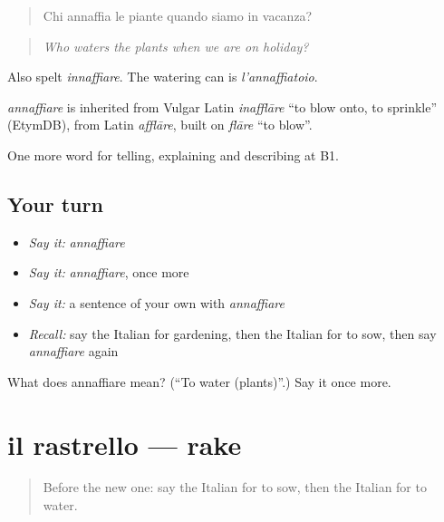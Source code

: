 \begin{quote}
Chi annaffia le piante quando siamo in vacanza?
\end{quote}

\begin{quote}
\emph{Who waters the plants when we are on holiday?}
\end{quote}

Also spelt \emph{innaffiare}. The watering can is \emph{l'annaffiatoio}.

\begin{cousinweb}
\emph{annaffiare} is inherited from Vulgar Latin \emph{inafflāre} \textquotedblleft{}to blow onto, to sprinkle\textquotedblright{} (EtymDB), from Latin \emph{afflāre}, built on \emph{flāre} \textquotedblleft{}to blow\textquotedblright{}.
\end{cousinweb}

\begin{grammarlens}[title={What you've built}]
One more word for telling, explaining and describing at B1.
\end{grammarlens}

\subsection*{Your turn}
\begin{itemize}
\raggedright
  \item \emph{Say it:} \emph{annaffiare}
  \item \emph{Say it:} \emph{annaffiare}, once more
  \item \emph{Say it:} a sentence of your own with \emph{annaffiare}
  \item \emph{Recall:} say the Italian for gardening, then the Italian for to sow, then say \emph{annaffiare} again
\end{itemize}

\begin{tcolorbox}[breakable,colback=teal!4,colframe=teal!35!black,title={Before you move on}]
What does annaffiare mean? (\textquotedblleft{}To water (plants)\textquotedblright{}.) Say it once more.
\end{tcolorbox}
\section[il rastrello]{il rastrello — rake}

\label{lesson:IT-C507-rastrello}



\begin{quote}
Before the new one: say the Italian for to sow, then the Italian for to water.
\end{quote}


